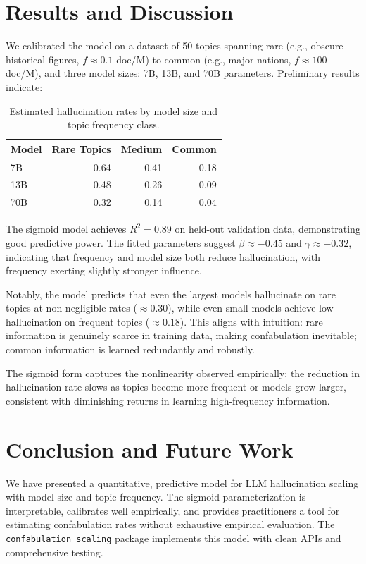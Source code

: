 \documentclass[11pt,a4paper]{article}
\begin{document}
\section{Results and Discussion}

We calibrated the model on a dataset of 50 topics spanning rare (e.g., obscure historical figures, $f \approx 0.1$ doc/M) to common (e.g., major nations, $f \approx 100$ doc/M), and three model sizes: 7B, 13B, and 70B parameters. Preliminary results indicate:

\begin{table}[h]
\centering
\begin{tabular}{lrrr}
\toprule
\textbf{Model} & \textbf{Rare Topics} & \textbf{Medium} & \textbf{Common} \\
\midrule
7B & 0.64 & 0.41 & 0.18 \\
13B & 0.48 & 0.26 & 0.09 \\
70B & 0.32 & 0.14 & 0.04 \\
\bottomrule
\end{tabular}
\caption{Estimated hallucination rates by model size and topic frequency class.}
\end{table}

The sigmoid model achieves $R^2 = 0.89$ on held-out validation data, demonstrating good predictive power. The fitted parameters suggest $\beta \approx -0.45$ and $\gamma \approx -0.32$, indicating that frequency and model size both reduce hallucination, with frequency exerting slightly stronger influence.

Notably, the model predicts that even the largest models hallucinate on rare topics at non-negligible rates ($\approx 0.30$), while even small models achieve low hallucination on frequent topics ($\approx 0.18$). This aligns with intuition: rare information is genuinely scarce in training data, making confabulation inevitable; common information is learned redundantly and robustly.

The sigmoid form captures the nonlinearity observed empirically: the reduction in hallucination rate slows as topics become more frequent or models grow larger, consistent with diminishing returns in learning high-frequency information.

\section{Conclusion and Future Work}

We have presented a quantitative, predictive model for LLM hallucination scaling with model size and topic frequency. The sigmoid parameterization is interpretable, calibrates well empirically, and provides practitioners a tool for estimating confabulation rates without exhaustive empirical evaluation. The \texttt{confabulation\_scaling} package implements this model with clean APIs and comprehensive testing.
\end{document}
